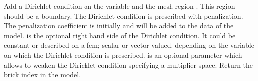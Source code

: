 \documentclass[a4paper,11pt,english]{sphinxmanual}
\begin{document}
\begin{fulllineitems}
\begin{fulllineitems}
\end{fulllineitems}


\begin{fulllineitems}
\label{\detokenize{python/cmdref_Model:getfem.Model.add_Dirichlet_condition_with_penalization}}
Add a Dirichlet condition on the variable  and the mesh
region . This region should be a boundary. The Dirichlet
condition is prescribed with penalization. The penalization coefficient
is initially  and will be added to the data of the model.
 is the optional right hand side of the Dirichlet condition.
It could be constant or described on a fem; scalar or vector valued,
depending on the variable on which the Dirichlet condition is prescribed.
 is an optional parameter which allows to weaken the
Dirichlet condition specifying a multiplier space.
Return the brick index in the model.

\end{fulllineitems}



\end{fulllineitems}
\end{document}
